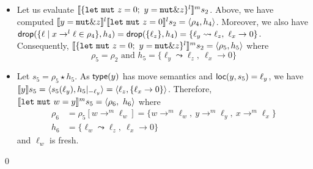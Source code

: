 \begin{example}
\begin{itemize}
    \item Let us evaluate
    $\denl[\{\mathtt{let\ mut}\ z = 0;\ y = \mathtt{mut}\borrow z\}^l]{m}{s_2}$.
    Above, we have computed $\denl[y = \mathtt{mut}\borrow z]{l}{
    \denl[\mathtt{let\ mut}\ z = 0]{l}{s_2}} = \langle\rho_4,h_4\rangle$.
    Moreover, we also have
    $\drop(\{\ell\mid x\to^l\ell\in\rho_4\},h_4) = \drop(\{\ell_z\},h_4) =
    \{\ell_y\leadsto\ell_z,\ \ell_x\to 0\}$. Consequently,
    $\denl[\{\mathtt{let\ mut}\ z = 0;\ y = \mathtt{mut}\borrow z\}^l]{m}{s_2} =
    \langle \rho_5,h_5\rangle$ where
    \[\rho_5 = \rho_2 \text{ and }
    h_5 = \{\ell_y\leadsto\ell_z,\ \ell_x\to 0\}\]
    \item Let $s_5 = \rho_5 \star h_5$. As $\type(y)$ has move semantics
    and $\loc(y,s_5)=\ell_y$, we have
    $\den[y]{s_5} = \langle s_5(\ell_y), h_5|_{-\ell_y}\rangle =
    \langle \ell_z, \{\ell_x\to 0\}\rangle$. Therefore,
    $\denl[\mathtt{let\ mut}\ w = y]{m}{s_5} =
    \langle \rho_6,\ h_6\rangle$ where
    \begin{align*}
      \rho_6 & = \rho_5[w\to^m\ell_w] =
      \{w\to^m\ell_w,\ y\to^m\ell_y,\ x\to^m\ell_x\}\\
      h_6 & = \{\ell_w \leadsto \ell_z,\ \ell_x\to 0\}
    \end{align*}
    and $\ell_w$ is fresh.
  \end{itemize}
  \qed
\end{example}
